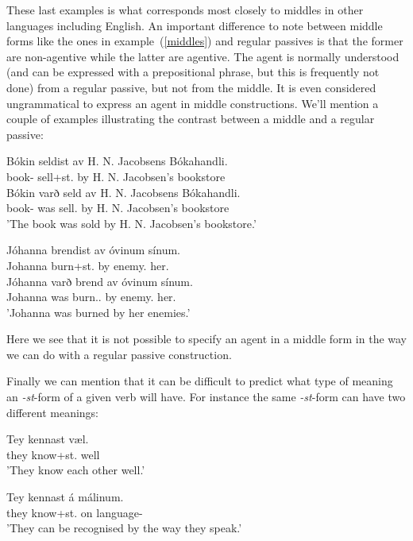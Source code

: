 \documentclass[12pt,%
]{lin-v2/lin}
\newcommand{\pref}[1]{(\ref{#1})}
\begin{document}
These last examples is what corresponds most closely to middles in other languages
including English. An important difference to note between middle forms like the ones
in example~\pref{middles} and regular passives is that the former are non-agentive while
the latter are agentive. The agent is normally understood (and can be expressed with
a prepositional phrase, but this is frequently not done) from a regular passive, but not from the middle.
It is even considered ungrammatical to express an agent in middle constructions. We'll
mention a couple of examples illustrating the contrast between a middle and a regular passive:
\begin{exe}
    \ex\label{middle_passive1}
    \begin{xlist}
        \ex \gll * Bókin seldist av H. N. Jacobsens Bókahandli.\\
        {} book-\Def{} sell+st.\Pst{} by H. N. Jacobsen's bookstore\\
        \ex \gll Bókin varð seld av H. N. Jacobsens Bókahandli.\\
        book-\Def{} was sell.\Pst{} by H. N. Jacobsen's bookstore\\ 
        \trans 'The book was sold by H. N. Jacobsen's bookstore.'\\
    \end{xlist}
    \ex\label{middle_passive2}
    \begin{xlist}
        \ex \gll * Jóhanna brendist av óvinum sínum.\\
        {} Johanna burn+st.\Pst{} by enemy.\Pl{} her.\Refl\\
        \ex \gll Jóhanna varð brend av óvinum sínum.\\
        Johanna was burn.\Pst.\Ptcp{} by enemy.\Pl{} her.\Refl\\ 
        \trans 'Johanna was burned by her enemies.'\\
    \end{xlist}
\end{exe}

Here we see that it is not possible to specify an agent in a middle form in the way we
can do with a regular passive construction.

Finally we can mention that it can be difficult to predict what type of meaning an
\emph{-st}-form of a given verb will have. For instance the same \emph{-st}-form can
have two different meanings:
\begin{exe}
    \ex\label{kennast}
    \begin{xlist}
        \item \gll Tey kennast væl.\\
        they know+st.\Prs{} well\\
        \trans 'They know each other well.'
        \item \gll Tey kennast á málinum.\\
        they know+st.\Prs{} on language-\Def\\
        \trans 'They can be recognised by the way they speak.'
    \end{xlist}
\end{exe}
\end{document}
